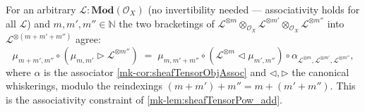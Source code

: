 \begin{lemma}\label{mk-lem:tensorPowAdd_assoc}
  \leanok

  For an arbitrary \(\mathcal{L} : \mathbf{Mod}(\mathcal{O}_X)\) (no invertibility
  needed --- associativity holds for all \(\mathcal{L}\)) and \(m, m', m'' \in \mathbb{N}\)
  the two bracketings of
  \(\mathcal{L}^{\otimes m} \otimes_{\mathcal{O}_X} \mathcal{L}^{\otimes m'}
  \otimes_{\mathcal{O}_X} \mathcal{L}^{\otimes m''}\) into
  \(\mathcal{L}^{\otimes (m+m'+m'')}\) agree:
  \[
    \mu_{m+m', m''} \circ (\mu_{m,m'} \rhd \mathcal{L}^{\otimes m''})
      \;=\;
    \mu_{m, m'+m''} \circ (\mathcal{L}^{\otimes m} \lhd \mu_{m',m''})
      \circ \alpha_{\mathcal{L}^{\otimes m}, \mathcal{L}^{\otimes m'},
        \mathcal{L}^{\otimes m''}},
  \]
  where \(\alpha\) is the associator \ref{mk-cor:sheafTensorObjAssoc} and \(\lhd,
  \rhd\) the canonical whiskerings, modulo the reindexings
  \((m+m')+m'' = m+(m'+m'')\). This is the associativity constraint of
  \ref{mk-lem:sheafTensorPow_add}.
\end{lemma}

